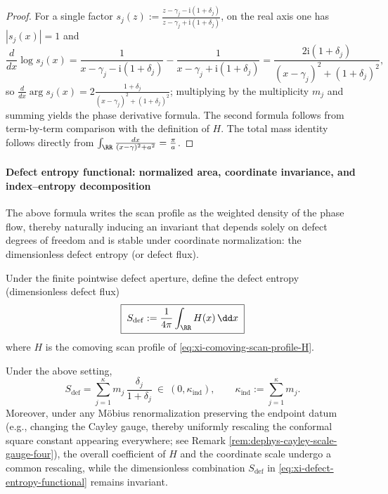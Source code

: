 \begin{proof}
For a single factor \(s_{j}(z):=\frac{z-\gamma_j-\mathrm{i}(1+\delta_j)}{z-\gamma_j+\mathrm{i}(1+\delta_j)}\), on the real axis one has \(|s_j(x)|=1\) and
\[
\frac{d}{dx}\log s_j(x)
=\frac{1}{x-\gamma_j-\mathrm{i}(1+\delta_j)}-\frac{1}{x-\gamma_j+\mathrm{i}(1+\delta_j)}
=\frac{2\mathrm{i}(1+\delta_j)}{(x-\gamma_j)^2+(1+\delta_j)^2},
\]
so \(\frac{d}{dx}\arg s_j(x)=2\frac{1+\delta_j}{(x-\gamma_j)^2+(1+\delta_j)^2}\);
multiplying by the multiplicity \(m_j\) and summing yields the phase derivative formula.
The second formula follows from term-by-term comparison with the definition of \(H\).
The total mass identity follows directly from \(\int_{\RR}\frac{dx}{(x-\gamma)^2+a^2}=\frac{\pi}{a}\). \qedhere
\end{proof}

\paragraph{Defect entropy functional: normalized area, coordinate invariance, and index--entropy decomposition}
The above formula writes the scan profile as the weighted density of the phase flow, thereby naturally inducing an invariant that depends solely on defect degrees of freedom and is stable under coordinate normalization: the dimensionless defect entropy (or defect flux).

\begin{definition}\label{def:xi-defect-entropy-functional}
Under the finite pointwise defect aperture, define the defect entropy (dimensionless defect flux)
\begin{equation}\label{eq:xi-defect-entropy-functional}
\boxed{\;
S_{\mathrm{def}}
:=\frac{1}{4\pi}\int_{\RR}H(x)\,\dd x\;}
\end{equation}
where \(H\) is the comoving scan profile of \eqref{eq:xi-comoving-scan-profile-H}.
\end{definition}

\begin{proposition}\label{prop:xi-defect-entropy-closed-form-invariant}
Under the above setting,
\begin{equation}\label{eq:xi-defect-entropy-closed-form}
\boxed{\;
S_{\mathrm{def}}
=\sum_{j=1}^{\kappa}m_j\,\frac{\delta_j}{1+\delta_j}\ \in\ (0,\kappa_{\mathrm{ind}}),\qquad
\kappa_{\mathrm{ind}}:=\sum_{j=1}^{\kappa}m_j.\;}
\end{equation}
Moreover, under any M\"obius renormalization preserving the endpoint datum (e.g., changing the Cayley gauge, thereby uniformly rescaling the conformal square constant appearing everywhere; see Remark \ref{rem:dephys-cayley-scale-gauge-four}), the overall coefficient of \(H\) and the coordinate scale undergo a common rescaling, while the dimensionless combination \(S_{\mathrm{def}}\) in \eqref{eq:xi-defect-entropy-functional} remains invariant.
\end{proposition}

